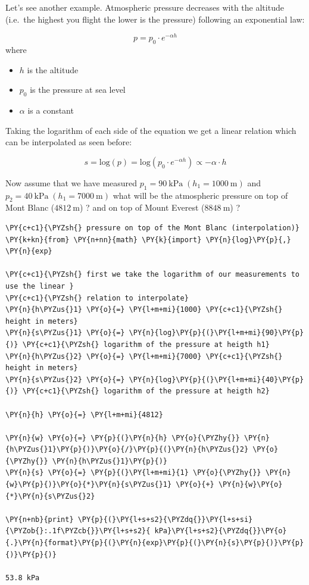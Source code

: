 Let's see another example. Atmospheric pressure decreases with the altitude (i.e.~the highest you flight the lower is the pressure) following an exponential law:

\begin{equation}
p = p_0\cdot e^{-\alpha h}
\end{equation}
where
\begin{itemize}
\tightlist
\item
  \(h\) is the altitude
\item
  \(p_0\) is the pressure at sea level
\item
  \(\alpha\) is a constant
\end{itemize}

Taking the logarithm of each side of the equation we get a linear relation which 
can be interpolated as seen before:

\begin{equation}
s = \mathrm{log}(p) = \mathrm{log}(p_0\cdot e^{-\alpha h})\propto - \alpha \cdot h
\end{equation}

Now assume that we have measured
\(p_1 = 90~\mathrm{kPa}\;(h_1 = 1000~\mathrm{m})\) and
\(p_2 = 40~\mathrm{kPa}\;(h_1 = 7000~\mathrm{m})\) what will be the
atmospheric pressure on top of Mont Blanc (\(4812~\mathrm{m}\)) ? and on top of Mount Everest (\(8848~\mathrm{m}\)) ?

\begin{codebox}
\begin{Verbatim}[commandchars=\\\{\}]
\PY{c+c1}{\PYZsh{} pressure on top of the Mont Blanc (interpolation)}
\PY{k+kn}{from} \PY{n+nn}{math} \PY{k}{import} \PY{n}{log}\PY{p}{,} \PY{n}{exp}

\PY{c+c1}{\PYZsh{} first we take the logarithm of our measurements to use the linear }
\PY{c+c1}{\PYZsh{} relation to interpolate}
\PY{n}{h\PYZus{}1} \PY{o}{=} \PY{l+m+mi}{1000} \PY{c+c1}{\PYZsh{} height in meters}
\PY{n}{s\PYZus{}1} \PY{o}{=} \PY{n}{log}\PY{p}{(}\PY{l+m+mi}{90}\PY{p}{)} \PY{c+c1}{\PYZsh{} logarithm of the pressure at heigth h1}
\PY{n}{h\PYZus{}2} \PY{o}{=} \PY{l+m+mi}{7000} \PY{c+c1}{\PYZsh{} height in meters}
\PY{n}{s\PYZus{}2} \PY{o}{=} \PY{n}{log}\PY{p}{(}\PY{l+m+mi}{40}\PY{p}{)} \PY{c+c1}{\PYZsh{} logarithm of the pressure at heigth h2}

\PY{n}{h} \PY{o}{=} \PY{l+m+mi}{4812}

\PY{n}{w} \PY{o}{=} \PY{p}{(}\PY{n}{h} \PY{o}{\PYZhy{}} \PY{n}{h\PYZus{}1}\PY{p}{)}\PY{o}{/}\PY{p}{(}\PY{n}{h\PYZus{}2} \PY{o}{\PYZhy{}} \PY{n}{h\PYZus{}1}\PY{p}{)}
\PY{n}{s} \PY{o}{=} \PY{p}{(}\PY{l+m+mi}{1} \PY{o}{\PYZhy{}} \PY{n}{w}\PY{p}{)}\PY{o}{*}\PY{n}{s\PYZus{}1} \PY{o}{+} \PY{n}{w}\PY{o}{*}\PY{n}{s\PYZus{}2}

\PY{n+nb}{print} \PY{p}{(}\PY{l+s+s2}{\PYZdq{}}\PY{l+s+si}{\PYZob{}:.1f\PYZcb{}}\PY{l+s+s2}{ kPa}\PY{l+s+s2}{\PYZdq{}}\PY{o}{.}\PY{n}{format}\PY{p}{(}\PY{n}{exp}\PY{p}{(}\PY{n}{s}\PY{p}{)}\PY{p}{)}\PY{p}{)}

53.8 kPa
\end{Verbatim}
\end{codebox}

